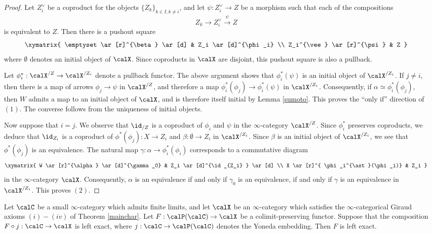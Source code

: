 \begin{proof}
Let $Z_{i}^{\vee}$ be a coproduct for the objects $\{ Z_{k} \}_{k \in I, k \neq i}$, and
let $\psi: Z_{i}^{\vee} \rightarrow Z$ be a morphism such that each of the compositions
$$ Z_{k} \rightarrow Z_{i}^{\vee} \stackrel{\psi}{\rightarrow} Z$$
is equivalent to $Z$. Then there is a pushout square
$$ \xymatrix{ \emptyset \ar[r]^{\beta} \ar[d] & Z_i \ar[d]^{\phi_i} \\
Z_i^{\vee} \ar[r]^{\psi} & Z }$$
where $\emptyset$ denotes an initial object of $\calX$.
Since coproducts in $\calX$ are disjoint, this pushout square is also a pullback.

Let $\phi_{i}^{\ast}: \calX^{/Z} \rightarrow \calX^{/Z_i}$ denote a pullback functor. The above
argument shows that $\phi_{i}^{\ast}(\psi)$ is an initial object of $\calX^{/Z_i}$.
If $j \neq i$, then there is a map of arrows $\phi_j \rightarrow \psi$ in $\calX^{/Z}$, and therefore a map $\phi_i^{\ast}(\phi_j) \rightarrow \phi_i^{\ast}(\psi)$ in $\calX^{/Z_i}$. Consequently,
if $\alpha \simeq \phi_i^{\ast}(\phi_j)$, then $W$ admits a map to an initial object of $\calX$, and is therefore itself initial by Lemma \ref{sumoto}. This proves the ``only if'' direction of $(1)$. The converse follows from the uniqueness of initial objects.

Now suppose that $i = j$. We observe that $\id_{/Z}$ is a coproduct of $\phi_i$ and $\psi$ in the
$\infty$-category $\calX^{/Z}$. Since $\phi_i^{\ast}$ preserves coproducts, we deduce
that $\id_{Z_i}$ is a coproduct of $\phi^{\ast}(\phi_j): X \rightarrow Z_i$ and $\beta: \emptyset \rightarrow Z_i$ in $\calX^{/Z_i}$. Since $\beta$ is an initial object of $\calX^{/Z_i}$, we see that
$\phi^{\ast}(\phi_j)$ is an equivalence. The natural map $\gamma: \alpha \rightarrow \phi_i^{\ast}(\phi_i)$
corresponds to a commutative diagram
$$ \xymatrix{ W \ar[r]^{\alpha} \ar[d]^{\gamma_0} & Z_i \ar[d]^{\id_{Z_i} } \ar[d] \\
X \ar[r]^{ \phi_i^{\ast}(\phi_i)} &  Z_i }$$
in the $\infty$-category $\calX$. Consequently, $\alpha$ is an equivalence if and only if
$\gamma_0$ is an equivalence, if and only if $\gamma$ is an equivalence in
$\calX^{/Z_i}$. This proves $(2)$.
\end{proof}

\begin{proposition}\label{natash}
Let $\calC$ be a small $\infty$-category which admits finite limits, and let
$\calX$ be an $\infty$-category which satisfies the $\infty$-categorical Giraud axioms
$(i)-(iv)$ of Theorem \ref{mainchar}. Let $F: \calP(\calC) \rightarrow \calX$ be
a colimit-preserving functor. Suppose that the composition
$F \circ j: \calC \rightarrow \calX$ is left exact, where $j: \calC \rightarrow \calP(\calC)$ denotes the Yoneda embedding. Then $F$ is left exact.
\end{proposition}

